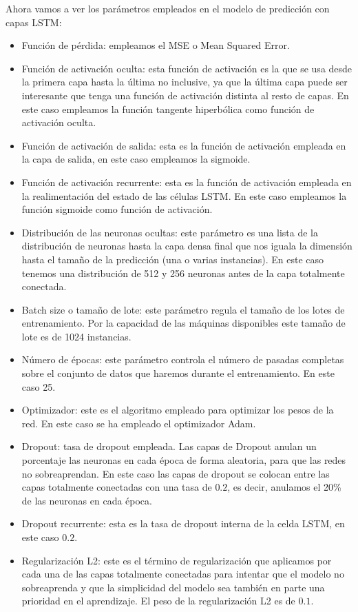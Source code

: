 Ahora vamos a ver los parámetros empleados en el modelo de predicción con capas LSTM:
\begin{itemize}
	\item Función de pérdida: empleamos el MSE o Mean Squared Error.
	\item Función de activación oculta: esta función de activación es la que se usa desde la primera capa hasta la última no inclusive, ya que la última capa puede ser interesante que tenga una función de activación distinta al resto de capas. En este caso empleamos la función tangente hiperbólica como función de activación oculta.
	\item Función de activación de salida: esta es la función de activación empleada en la capa de salida, en este caso empleamos la sigmoide.
	\item Función de activación recurrente: esta es la función de activación empleada en la realimentación del estado de las células LSTM. En este caso empleamos la función sigmoide como función de activación.
	\item Distribución de las neuronas ocultas: este parámetro es una lista de la distribución de neuronas hasta la capa densa final que nos iguala la dimensión hasta el tamaño de la predicción (una o varias instancias). En este caso tenemos una distribución de 512 y 256 neuronas antes de la capa totalmente conectada.
	\item Batch size o tamaño de lote: este parámetro regula el tamaño de los lotes de entrenamiento. Por la capacidad de las máquinas disponibles este tamaño de lote es de 1024 instancias.
	\item Número de épocas: este parámetro controla el número de pasadas completas sobre el conjunto de datos que haremos durante el entrenamiento. En este caso 25.
	\item Optimizador: este es el algoritmo empleado para optimizar los pesos de la red. En este caso se ha empleado el optimizador Adam.
	\item Dropout: tasa de dropout empleada. Las capas de Dropout anulan un porcentaje las neuronas en cada época de forma aleatoria, para que las redes no sobreaprendan. En este caso las capas de dropout se colocan entre las capas totalmente conectadas con una tasa de $0.2$, es decir, anulamos el 20\% de las neuronas en cada época.
	\item Dropout recurrente: esta es la tasa de dropout interna de la celda LSTM, en este caso $0.2$.
	\item Regularización L2: este es el término de regularización que aplicamos por cada una de las capas totalmente conectadas para intentar que el modelo no sobreaprenda y que la simplicidad del modelo sea también en parte una prioridad en el aprendizaje. El peso de la regularización L2 es de $0.1$.

\end{itemize}
